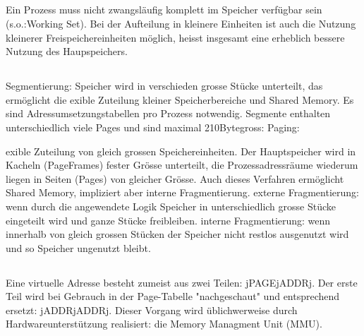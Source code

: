 \subsection{}
\begin{answer}
Ein Prozess muss nicht zwangsläufig komplett im Speicher verfügbar sein (s.o.:Working
Set). Bei der Aufteilung in kleinere Einheiten ist auch die Nutzung kleinerer Freispeichereinheiten
möglich, heisst insgesamt eine erheblich bessere Nutzung des Haupspeichers.
\end{answer}

\subsection{}
\begin{answer}
Segmentierung:
Speicher wird in verschieden grosse Stücke unterteilt, das ermöglicht die 
exible Zuteilung
kleiner Speicherbereiche und Shared Memory.
Es sind Adressumsetzungstabellen pro Prozess notwendig.
Segmente enthalten unterschiedlich viele Pages und sind maximal 210Bytegross:
Paging:

exible Zuteilung von gleich grossen Speichereinheiten. Der Hauptspeicher wird in Kacheln (PageFrames)
fester Grösse unterteilt, die Prozessadressräume wiederum liegen in Seiten (Pages) von
gleicher Grösse. Auch dieses Verfahren ermöglicht Shared Memory, impliziert aber interne Fragmentierung.
externe Fragmentierung: wenn durch die angewendete Logik Speicher in unterschiedlich grosse
Stücke eingeteilt wird und ganze Stücke freibleiben.
interne Fragmentierung: wenn innerhalb von gleich grossen Stücken der Speicher nicht restlos
ausgenutzt wird und so Speicher ungenutzt bleibt.
\end{answer}

\subsection{}
\begin{answer}
Eine virtuelle Adresse besteht zumeist aus zwei Teilen: jPAGEjADDRj. Der erste Teil wird bei
Gebrauch in der Page-Tabelle "nachgeschaut" und entsprechend ersetzt: jADDRjADDRj.
Dieser Vorgang wird üblichwerweise durch Hardwareunterstützung realisiert: die Memory Managment
Unit (MMU).
\end{answer}


